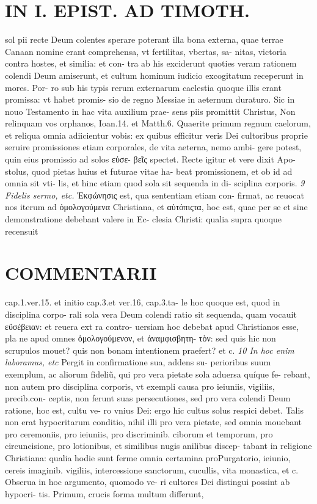 \documentclass{article}
\begin{document}
\begin{pages}
\section*{IN I. EPIST. AD TIMOTH. }
\marginpar{[ p.101 ]}\pstart sol pii recte Deum colentes sperare poterant illa bona externa, quae terrae Canaan nomine erant comprehensa, vt fertilitas, vbertas, sa- nitas, victoria contra hostes, et similia: et con- tra ab his exciderunt quoties veram rationem colendi Deum amiserunt, et cultum hominum iudicio excogitatum receperunt in mores. Por- ro sub his typis rerum externarum caelestia quoque illis erant promissa: vt habet promis- sio de regno Messiae in aeternum duraturo. Sic in nouo Testamento in hac vita auxilium prae- sens piis promittit Christus, Non relinquam vos orphanos, Ioan.14. et Matth.6. Quaerite primum regnum caelorum, et reliqua omnia adiicientur vobis: ex quibus efficitur veris Dei cultoribus proprie seruire promissiones etiam corporales, de vita aeterna, nemo ambi- gere potest, quin eius promissio ad solos εὐσε- βεῖς spectet. Recte igitur et vere dixit Apo- stolus, quod pietas huius et futurae vitae ha- beat promissionem, et ob id ad omnia sit vti- lis, et hinc etiam quod sola sit sequenda in di- sciplina corporis.  \pend
\textit{9 Fidelis sermo, etc. }\pstart Ἐκφώνησις est, qua sententiam etiam con- firmat, ac reuocat nos iterum ad ὁμολογούμενα Christiana, et αὐτόπιςτα, hoc est, quae per se et sine demonstratione debebant valere in Ec- clesia Christi: qualia supra quoque recensuit  \pend
\marginpar{[ p.102 ]}
\section*{COMMENTARII }\pstart cap.1.ver.15. et initio cap.3.et ver.16, cap.3.ta- le hoc quoque est, quod in disciplina corpo- rali sola vera Deum colendi ratio sit sequenda, quam vocauit εὔσέβειαν: et reuera ext ra contro- uersiam hoc debebat apud Christianos esse, pla ne apud omnes ὁμολογούμενον, et ἀναμφισβητη- τὸν: sed quis hic non scrupulos mouet? quis non bonam intentionem praefert? et c.  \pend
\textit{10 In hoc enim laboramus, etc }\pstart Pergit in confirmatione sua, addens su- perioribus suum exemplum, ac aliorum fideliũ, qui pro vera pietate sola aduersa quíque fe- rebant, non autem pro disciplina corporis, vt exempli causa pro ieiuniis, vigiliis, precib.con- ceptis, non ferunt suas persecutiones, sed pro vera colendi Deum ratione, hoc est, cultu ve- ro vnius Dei: ergo hic cultus solus respici debet. Talis non erat hypocritarum conditio, nihil illi pro vera pietate, sed omnia mouebant pro ceremoniis, pro ieiuniis, pro discriminib. ciborum et temporum, pro circuncisione, pro lotionibus, et similibus nugis anilibus discep- tabant in religione Christiana: qualia hodie sunt ferme omnia certamina proPurgatorio, ieiunio, cereis imaginib. vigiliis, intercessione sanctorum, cucullis, vita monastica, et c. Obserua in hoc argumento, quomodo ve- ri cultores Dei distingui possint ab hypocri- tis. Primum, crucis forma multum differunt,  \pend

\end{pages}
\end{document}
